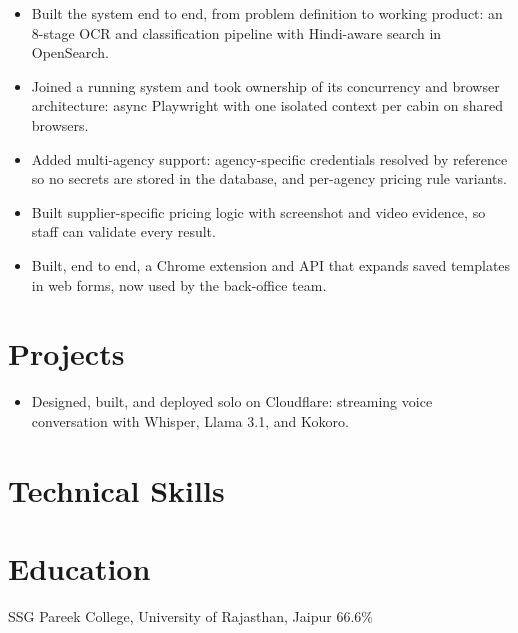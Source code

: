 \documentclass[10pt,a4paper]{article}
\begin{document}
\begin{itemize}
  \item Built the system end to end, from problem definition to working product: an 8-stage OCR and classification pipeline with Hindi-aware search in OpenSearch.
\end{itemize}

\vspace{4pt}

\begin{itemize}
  \item Joined a running system and took ownership of its concurrency and browser architecture: async Playwright with one isolated context per cabin on shared browsers.
  \item Added multi-agency support: agency-specific credentials resolved by reference so no secrets are stored in the database, and per-agency pricing rule variants.
  \item Built supplier-specific pricing logic with screenshot and video evidence, so staff can validate every result.
\end{itemize}

\begin{itemize}
  \item Built, end to end, a Chrome extension and API that expands saved templates in web forms, now used by the back-office team.
\end{itemize}

\vspace{4pt}

\section{Projects}
\begin{itemize}
  \item Designed, built, and deployed solo on Cloudflare: streaming voice conversation with Whisper, Llama 3.1, and Kokoro.
\end{itemize}

\section{Technical Skills}

\section{Education}
SSG Pareek College, University of Rajasthan, Jaipur \textbar{} 66.6\%\par
\end{document}

